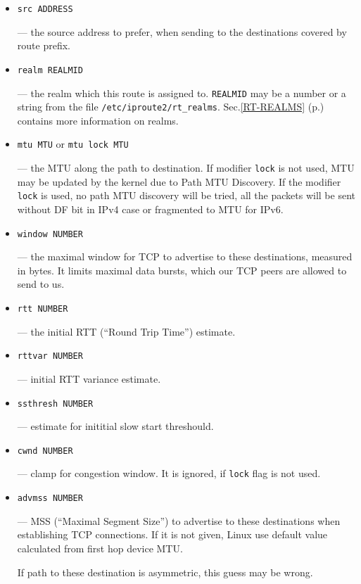 \begin{itemize}
\item \verb|src ADDRESS|

--- the source address to prefer, when sending to the destinations
covered by route prefix.

\item \verb|realm REALMID|

--- the realm which this route is assigned to. 
\verb|REALMID| may be a number or a string from the file
\verb|/etc/iproute2/rt_realms|. Sec.\ref{RT-REALMS} (p.\pageref{RT-REALMS})
contains more information on realms.

\item \verb|mtu MTU| or \verb|mtu lock MTU|

--- the MTU along the path to destination. If modifier \verb|lock| is
not used, MTU may be updated by the kernel due to Path MTU Discovery.
If the modifier \verb|lock| is used, no path MTU discovery will be tried,
all the packets will be sent without DF bit in IPv4 case
or fragmented to MTU for IPv6.

\item \verb|window NUMBER|

--- the maximal window for TCP to advertise to these destinations,
measured in bytes. It limits maximal data bursts, which our TCP
peers are allowed to send to us.

\item \verb|rtt NUMBER|

--- the initial RTT (``Round Trip Time'') estimate.


\item \verb|rttvar NUMBER|

--- \threeonly initial RTT variance estimate.


\item \verb|ssthresh NUMBER|

--- \threeonly estimate for inititial slow start threshould.


\item \verb|cwnd NUMBER|

--- \threeonly clamp for congestion window. It is ignored, if \verb|lock|
    flag is not used.


\item \verb|advmss NUMBER|

--- \threeonly MSS (``Maximal Segment Size'') to advertise to these
    destinations when establishing TCP connections. If it is not given,
    Linux use default value calculated from first hop device MTU.

\begin{NB}
  If path to these destination is asymmetric, this guess may be wrong.
\end{NB}
    



\end{itemize}

